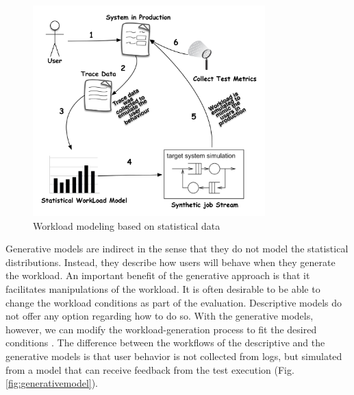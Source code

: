 \begin{figure}[!ht]

\centering
\includegraphics[width=0.8\textwidth]{./images/workloadmodel1300dpi.png}
\caption{Workload modeling based on statistical data \cite{DiLucca2006}}
\label{fig:descriptivemodel}
\end{figure}


Generative models are indirect in the sense that they do not model the statistical distributions. Instead, they describe how users will behave when they generate the workload. An important benefit of the generative approach is that it facilitates manipulations of the workload. It is often desirable to be able to change the workload conditions as part of the evaluation. Descriptive models do not offer any option regarding how to do so. With the generative models, however, we can modify the workload-generation process to fit the desired conditions \cite{DiLucca2006}. The difference between the workflows of the descriptive and the generative models is that user behavior is not collected from logs, but simulated from a model that can receive feedback from the test execution (Fig. \ref{fig:generativemodel}).


